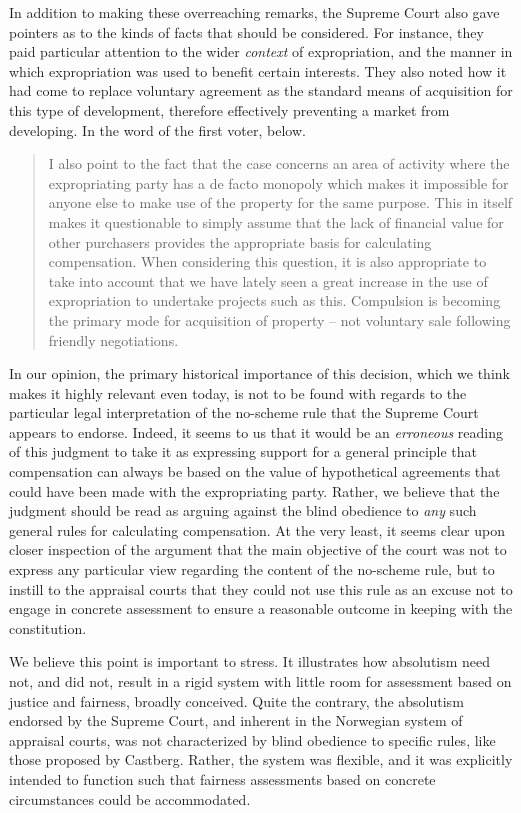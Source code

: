 In addition to making these overreaching remarks, the Supreme Court also gave pointers as to the kinds of facts that should be considered. For instance, they paid particular attention to the wider \emph{context} of expropriation, and the manner in which expropriation was used to benefit certain interests. They also noted how it had come to replace voluntary agreement as the standard means of acquisition for this type of development, therefore effectively preventing a market from developing. In the word of the first voter, below.

\begin{quote}
I also point to the fact that the case concerns an area of activity where the expropriating party has a de facto monopoly which makes it impossible for anyone else to make use of the property for the same purpose. This in itself makes it questionable to simply assume that the lack of financial value for other purchasers provides the appropriate basis for calculating compensation. When considering this question, it is also appropriate to take into account that we have lately seen a great increase in the use of expropriation to undertake projects such as this. Compulsion is becoming the primary mode for acquisition of property -- not voluntary sale following friendly negotiations.
\end{quote} 

In our opinion, the primary historical importance of this decision, which we think makes it highly relevant even today, is not to be found with regards to the particular legal interpretation of the no-scheme rule that the Supreme Court appears to endorse. Indeed, it seems to us that it would be an \emph{erroneous} reading of this judgment to take it as expressing support for a general principle that compensation can always be based on the value of hypothetical agreements that could have been made with the expropriating party. Rather, we believe that the judgment should be read as arguing against the blind obedience to \emph{any} such general rules for calculating compensation. At the very least, it seems clear upon closer inspection of the argument that the main objective of the court was not to express any particular view regarding the content of the no-scheme rule, but to instill to the appraisal courts that they could not use this rule as an excuse not to engage in concrete assessment to ensure a reasonable outcome in keeping with the constitution.

We believe this point is important to stress. It illustrates how absolutism need not, and did not, result in a rigid system with little room for assessment based on justice and fairness, broadly conceived. Quite the contrary, the absolutism endorsed by the Supreme Court, and inherent in the Norwegian system of appraisal courts, was not characterized by blind obedience to specific rules, like those proposed by Castberg. Rather, the system was flexible, and it was explicitly intended to function such that fairness assessments based on concrete circumstances could be accommodated. 

